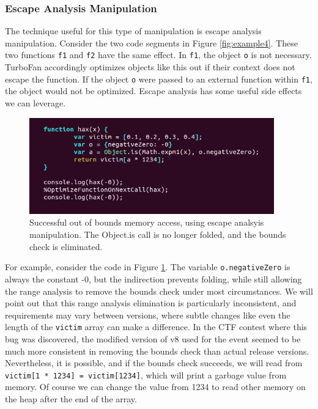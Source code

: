 \documentclass[11pt]{article}
\begin{document}
\subsubsection{Escape Analysis Manipulation}
The technique useful for this type of manipulation is escape analysis
manipulation. Consider the two code segments in Figure \ref{fig:example4}.
These two functions \texttt{f1} and \texttt{f2} have the same effect. In
\texttt{f1}, the object \texttt{o} is not necessary. TurboFan accordingly
optimizes objects like this out if their context does not escape the function.
If the object \texttt{o} were passed to an external function within
\texttt{f1}, the object would not be optimized. Escape analysis has some
useful side effects we can leverage. 
\begin{figure}
	\centering
	\includegraphics[width=300pt]{example6.png}
	\caption{Successful out of bounds memory access, using escape analsyis manipulation. The
	Object.is call is no longer folded, and the bounds check is eliminated.}
  \label{fig:example6}
\end{figure}
For example, consider the code in Figure \ref{fig:example6}.
The variable \texttt{o.negativeZero} is always the constant -0, but the indirection prevents
folding, while still allowing the range analysis to remove the bounds check under most
circumstances. We will point out that this range analysis elimination is particularly inconsistent,
and requirements may vary between versions, where subtle changes like even the length of the 
\texttt{victim} array can make a difference. In the CTF contest where this bug was discovered, the
modified version of v8 used for the event seemed to be much more consistent in removing the bounds
check than actual release versions. Nevertheless, it is possible, and if the bounds check succeeds,
we will read from \texttt{victim[1 * 1234] = victim[1234]}, which will print a garbage value from
memory. Of course we can change the value from 1234 to read other memory on the heap after the end
of the array.
\end{document}
